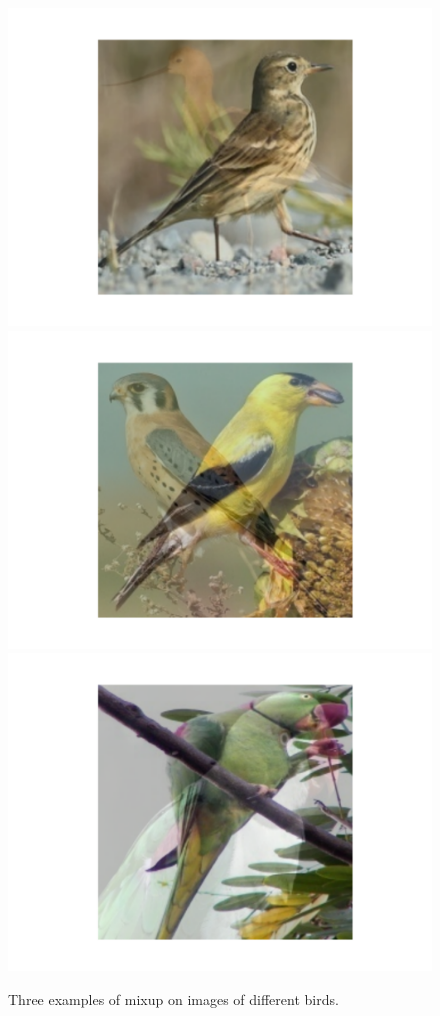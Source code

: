 \documentclass{article}
\begin{document}
\begin{figure}[!htb]
	\includegraphics[trim=3cm 2cm 3cm 3cm, width=\linewidth]{mixup1.pdf}
	\endminipage\hfill
	\includegraphics[trim=3cm 2cm 3cm 3cm, width=\linewidth]{mixup2.pdf}
	\endminipage\hfill
	\includegraphics[trim=3cm 2cm 3cm 3cm, width=\linewidth]{mixup3.pdf}
	\endminipage
	\caption{Three examples of mixup on images of different birds.}
\end{figure}
\end{document}

